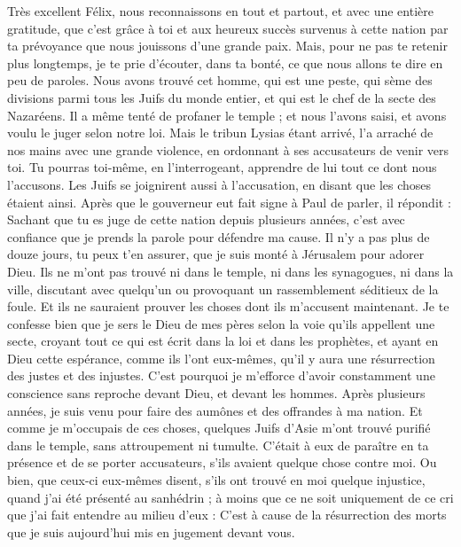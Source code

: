 \begin{multicols}{2}
Très excellent Félix, nous reconnaissons en tout et partout, et avec une entière gratitude, que c’est grâce à toi et aux heureux succès survenus à cette nation par ta prévoyance que nous jouissons d’une grande paix.
Mais, pour ne pas te retenir plus longtemps, je te prie d’écouter, dans ta bonté, ce que nous allons te dire en peu de paroles.
Nous avons trouvé cet homme, qui est une peste, qui sème des divisions parmi tous les Juifs du monde entier, et qui est le chef de la secte des Nazaréens.
Il a même tenté de profaner le temple ; et nous l'avons saisi, et avons voulu le juger selon notre loi.
Mais le tribun Lysias étant arrivé, l'a arraché de nos mains avec une grande violence,
en ordonnant à ses accusateurs de venir vers toi. Tu pourras toi-même, en l'interrogeant, apprendre de lui tout ce dont nous l'accusons.
Les Juifs se joignirent aussi à l’accusation, en disant que les choses étaient ainsi.
Après que le gouverneur eut fait signe à Paul de parler, il répondit : Sachant que tu es juge de cette nation depuis plusieurs années, c’est avec confiance que je prends la parole pour défendre ma cause.
Il n’y a pas plus de douze jours, tu peux t’en assurer, que je suis monté à Jérusalem pour adorer Dieu.
Ils ne m’ont pas trouvé ni dans le temple, ni dans les synagogues, ni dans la ville, discutant avec quelqu’un ou provoquant un rassemblement séditieux de la foule.
Et ils ne sauraient prouver les choses dont ils m'accusent maintenant.
Je te confesse bien que je sers le Dieu de mes pères selon la voie qu’ils appellent une secte, croyant tout ce qui est écrit dans la loi et dans les prophètes,
et ayant en Dieu cette espérance, comme ils l’ont eux-mêmes, qu’il y aura une résurrection des justes et des injustes.
C'est pourquoi je m’efforce d’avoir constamment une conscience sans reproche devant Dieu, et devant les hommes.
Après plusieurs années, je suis venu pour faire des aumônes et des offrandes à ma nation.
Et comme je m’occupais de ces choses, quelques Juifs d’Asie m’ont trouvé purifié dans le temple, sans attroupement ni tumulte.
C’était à eux de paraître en ta présence et de se porter accusateurs, s’ils avaient quelque chose contre moi.
Ou bien, que ceux-ci eux-mêmes disent, s'ils ont trouvé en moi quelque injustice, quand j'ai été présenté au sanhédrin ;
à moins que ce ne soit uniquement de ce cri que j’ai fait entendre au milieu d’eux : C’est à cause de la résurrection des morts que je suis aujourd’hui mis en jugement devant vous.

\end{multicols}
